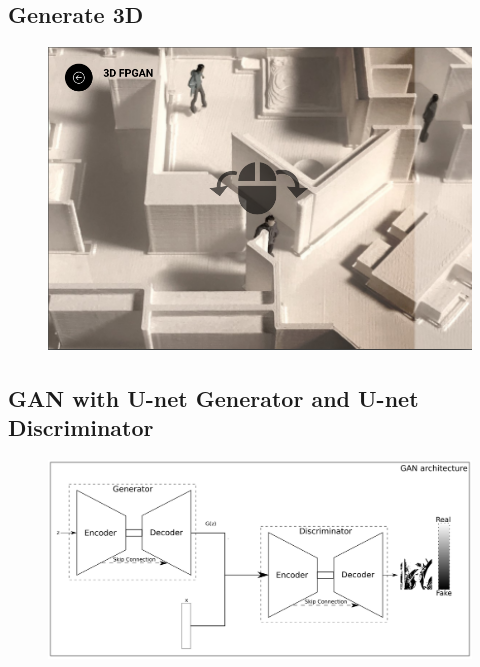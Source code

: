 	\subsection{Generate 3D} \label{Appendix: Generate 3D}
		\begin{figure}[H]
			\centering
				\includegraphics[width=1\textwidth]{img/chapter_7/3d.png}
				
		\end{figure}	
	\subsection{GAN with U-net Generator and U-net Discriminator}\label{Appendix: unetwithunet}
	\begin{figure}[H]
		\centering
			\includegraphics[width=1\textwidth]{img/experiments/unetwithunet.png}
			
		\end{figure}
	